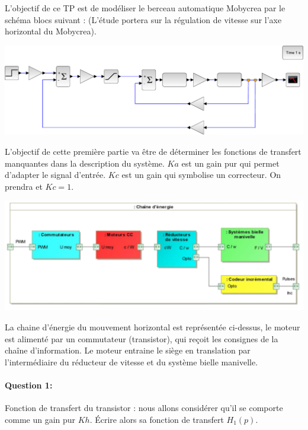 

\ifdef{\public}{\cleardoublepage}{}



L'objectif de ce TP est de modéliser le berceau automatique Mobycrea par le schéma blocs
suivant : (L'étude portera sur la régulation de vitesse sur l'axe horizontal du Mobycrea).

\begin{center}
 \includegraphics[width=0.95\linewidth]{img/mobycrea}
\end{center}

L'objectif de cette première partie va être de déterminer les fonctions de transfert manquantes
dans la description du système. $Ka$ est un gain pur qui permet d'adapter le signal d'entrée. $Kc$ est
un gain qui symbolise un correcteur. On prendra et $Kc=1$.

\begin{center}
 \includegraphics[width=0.95\linewidth]{img/chaine_energie}
\end{center}

La chaine d'énergie du mouvement horizontal est représentée ci-dessus, le moteur est alimenté
par un commutateur (transistor), qui reçoit les consignes de la chaîne d'information. Le moteur
entraine le siège en translation par l'intermédiaire du réducteur de vitesse et du système bielle
manivelle.

\paragraph{Question 1:} Fonction de transfert du transistor : nous allons considérer qu'il se comporte comme un gain pur $Kh$. Écrire alors sa fonction de transfert $H_1(p)$.


